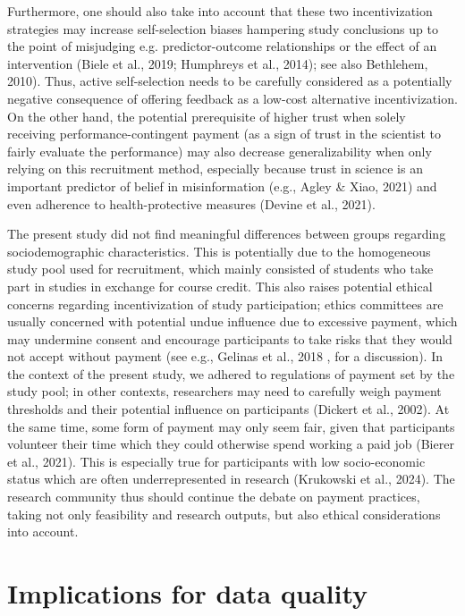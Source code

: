 \documentclass[authordate, empirical]{jote-new-article}
\begin{document}
	Furthermore, one should also take into account that these two incentivization strategies may increase self-selection biases hampering study conclusions up to the point of misjudging e.g. predictor-outcome relationships or the effect of an intervention (Biele et al., 2019; Humphreys et al., 2014); see also Bethlehem, 2010). Thus, active self-selection needs to be carefully considered as a potentially negative consequence of offering feedback as a low-cost alternative incentivization. On the other hand, the potential prerequisite of higher trust when solely receiving performance-contingent payment (as a sign of trust in the scientist to fairly evaluate the performance) may also decrease generalizability when only relying on this recruitment method, especially because trust in science is an important predictor of belief in misinformation (e.g., Agley \& Xiao, 2021) and even adherence to health-protective measures (Devine et al., 2021).



	The present study did not find meaningful differences between groups regarding sociodemographic characteristics. This is potentially due to the homogeneous study pool used for recruitment, which mainly consisted of students who take part in studies in exchange for course credit. This also raises potential ethical concerns regarding incentivization of study participation; ethics committees are usually concerned with potential undue influence due to excessive payment, which may undermine consent and encourage participants to take risks that they would not accept without payment (see e.g., Gelinas et al., 2018 , for a discussion). In the context of the present study, we adhered to regulations of payment set by the study pool; in other contexts, researchers may need to carefully weigh payment thresholds and their potential influence on participants (Dickert et al., 2002). At the same time, some form of payment may only seem fair, given that participants volunteer their time which they could otherwise spend working a paid job (Bierer et al., 2021). This is especially true for participants with low socio-economic status which are often underrepresented in research (Krukowski et al., 2024). The research community thus should continue the debate on payment practices, taking not only feasibility and research outputs, but also ethical considerations into account.



	\section{\textbf{Implications for data quality}}
\end{document}
